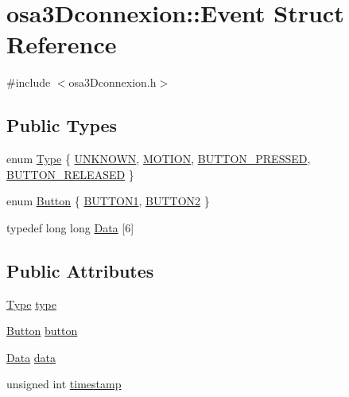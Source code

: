 \hypertarget{structosa3_dconnexion_1_1_event}{\section{osa3\-Dconnexion\-:\-:Event Struct Reference}
\label{structosa3_dconnexion_1_1_event}
}


{\ttfamily \#include $<$osa3\-Dconnexion.\-h$>$}

\subsection*{Public Types}
\begin{DoxyCompactItemize}
\item 
enum \hyperlink{structosa3_dconnexion_1_1_event_aaa4e518fe0d3d3d37c21fa6badd76ce8}{Type} \{ \hyperlink{structosa3_dconnexion_1_1_event_aaa4e518fe0d3d3d37c21fa6badd76ce8aee40e3dd30b7da3c5949a3c14c0556a3}{U\-N\-K\-N\-O\-W\-N}, 
\hyperlink{structosa3_dconnexion_1_1_event_aaa4e518fe0d3d3d37c21fa6badd76ce8ab9e1d7ae1e96ef2b9831e16f8c85c648}{M\-O\-T\-I\-O\-N}, 
\hyperlink{structosa3_dconnexion_1_1_event_aaa4e518fe0d3d3d37c21fa6badd76ce8aee8b2fe042ad1f291bd397a09918e202}{B\-U\-T\-T\-O\-N\-\_\-\-P\-R\-E\-S\-S\-E\-D}, 
\hyperlink{structosa3_dconnexion_1_1_event_aaa4e518fe0d3d3d37c21fa6badd76ce8ab41e4f7dcab2710e78b090a470860574}{B\-U\-T\-T\-O\-N\-\_\-\-R\-E\-L\-E\-A\-S\-E\-D}
 \}
\item 
enum \hyperlink{structosa3_dconnexion_1_1_event_aec32735e02840e97c0502ba04759c0e2}{Button} \{ \hyperlink{structosa3_dconnexion_1_1_event_aec32735e02840e97c0502ba04759c0e2a0a2f6037b45dda9297d174180fcc805f}{B\-U\-T\-T\-O\-N1}, 
\hyperlink{structosa3_dconnexion_1_1_event_aec32735e02840e97c0502ba04759c0e2a311eda116d8ca2813d21e95b434ecc46}{B\-U\-T\-T\-O\-N2}
 \}
\item 
typedef long long \hyperlink{structosa3_dconnexion_1_1_event_a04c20e131cad7e8432b6fea40725c745}{Data} \mbox{[}6\mbox{]}
\end{DoxyCompactItemize}
\subsection*{Public Attributes}
\begin{DoxyCompactItemize}
\item 
\hyperlink{structosa3_dconnexion_1_1_event_aaa4e518fe0d3d3d37c21fa6badd76ce8}{Type} \hyperlink{structosa3_dconnexion_1_1_event_a5deeb96b286234ec1e97387494676d05}{type}
\item 
\hyperlink{structosa3_dconnexion_1_1_event_aec32735e02840e97c0502ba04759c0e2}{Button} \hyperlink{structosa3_dconnexion_1_1_event_a7cf9cc55aff27ec81a95735ae1906b0d}{button}
\item 
\hyperlink{structosa3_dconnexion_1_1_event_a04c20e131cad7e8432b6fea40725c745}{Data} \hyperlink{structosa3_dconnexion_1_1_event_a328ab06ff93f5426fd240fcd5a647449}{data}
\item 
unsigned int \hyperlink{structosa3_dconnexion_1_1_event_a2f0ccc260bb38dfe16957e33e5752a35}{timestamp}
\end{DoxyCompactItemize}


